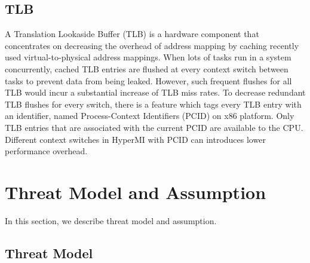 \documentclass[conference]{IEEEtran}
\begin{document}
\subsection{TLB}
A Translation Lookaside Buffer (TLB) is a hardware component that concentrates on decreasing the overhead of address mapping by caching recently used virtual-to-physical address mappings. When lots of tasks run in a system concurrently, cached TLB entries are flushed at every context switch between tasks to prevent data from being leaked. However, such frequent flushes for all TLB would incur a substantial increase of TLB miss rates. To decrease redundant TLB flushes for every switch, there is a feature which tags every TLB entry with an identifier, named Process-Context Identifiers (PCID) on x86 platform. Only TLB entries that are associated with the current PCID are available to the CPU. Different context switches in HyperMI with PCID can introduces lower performance overhead.
\fi
\fi






\section{Threat Model and Assumption}

In this section, we describe threat model and assumption.


\subsection{Threat Model} \label {threat}

\end{document}
